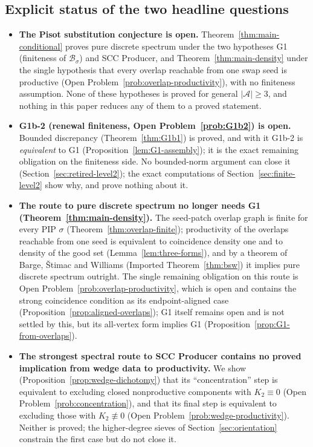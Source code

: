 \documentclass[11pt]{amsart}
\theoremstyle{plain}
\theoremstyle{definition}
\theoremstyle{remark}
\newcommand{\A}{\mathcal{A}}
\newcommand{\B}{\mathcal{B}}
\newcommand{\PDS}{pure discrete spectrum}
\begin{document}
\subsection{Explicit status of the two headline questions}\label{sec:headline-status}
\begin{itemize}[leftmargin=*]
\item \textbf{The Pisot substitution conjecture is open.} Theorem~\ref{thm:main-conditional} proves \PDS{} under the two hypotheses G1 (finiteness of $\B_\sigma$) and SCC Producer, and Theorem~\ref{thm:main-density} under the single hypothesis that every overlap reachable from one swap seed is productive (Open Problem~\ref{prob:overlap-productivity}), with no finiteness assumption. None of these hypotheses is proved for general $|\A|\ge 3$, and nothing in this paper reduces any of them to a proved statement.
\item \textbf{G1b-2 (renewal finiteness, Open Problem~\ref{prob:G1b2}) is open.} Bounded discrepancy (Theorem~\ref{thm:G1b1}) is proved, and with it G1b-2 is \emph{equivalent} to G1 (Proposition~\ref{lem:G1-assembly}); it is the exact remaining obligation on the finiteness side. No bounded-norm argument can close it (Section~\ref{sec:retired-level2}); the exact computations of Section~\ref{sec:finite-level2} show why, and prove nothing about it.
\item \textbf{The route to \PDS{} no longer needs G1 (Theorem~\ref{thm:main-density}).} The seed-patch overlap graph is finite for every PIP $\sigma$ (Theorem~\ref{thm:overlap-finite}); productivity of the overlaps reachable from one seed is equivalent to coincidence density one and to density of the good set (Lemma~\ref{lem:three-forms}), and by a theorem of Barge, \v{S}timac and Williams (Imported Theorem~\ref{thm:bsw}) it implies \PDS{} outright. The single remaining obligation on this route is Open Problem~\ref{prob:overlap-productivity}, which is open and contains the strong coincidence condition as its endpoint-aligned case (Proposition~\ref{prop:aligned-overlaps}); G1 itself remains open and is not settled by this, but its all-vertex form implies G1 (Proposition~\ref{prop:G1-from-overlaps}).
\item \textbf{The strongest spectral route to SCC Producer contains no proved implication from wedge data to productivity.} We show (Proposition~\ref{prop:wedge-dichotomy}) that its ``concentration'' step is equivalent to excluding closed nonproductive components with $K_2\equiv0$ (Open Problem~\ref{prob:concentration}), and that its final step is equivalent to excluding those with $K_2\not\equiv0$ (Open Problem~\ref{prob:wedge-productivity}). Neither is proved; the higher-degree sieves of Section~\ref{sec:orientation} constrain the first case but do not close it.

\end{itemize}
\end{document}
